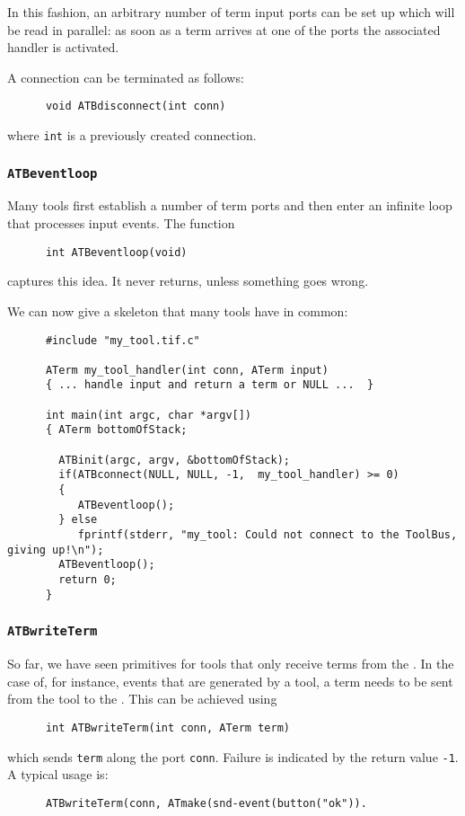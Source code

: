 \documentclass[a4,twoside,noweb]{article} %
\begin{document}
In this fashion, an arbitrary number of term input ports can be set up which
will be read in parallel: as soon as a term arrives at one of the ports
the associated handler is activated.

A connection can be terminated as follows:
\begin{verbatim}
      void ATBdisconnect(int conn)
\end{verbatim}
where {\tt int} is a previously created connection.

\subsubsection{\label{ATBeventloop}{\tt ATBeventloop}}
Many tools first establish a number of term ports
and then enter an infinite loop that processes input events.
The function
\begin{verbatim}
      int ATBeventloop(void)
\end{verbatim}
captures this idea. It never returns, unless something goes wrong.

We can now give a skeleton that many tools have in common:

\begin{verbatim}
      #include "my_tool.tif.c"

      ATerm my_tool_handler(int conn, ATerm input)
      { ... handle input and return a term or NULL ...  }

      int main(int argc, char *argv[]) 
      { ATerm bottomOfStack;

        ATBinit(argc, argv, &bottomOfStack);
        if(ATBconnect(NULL, NULL, -1,  my_tool_handler) >= 0)
        {
           ATBeventloop();
        } else 
           fprintf(stderr, "my_tool: Could not connect to the ToolBus, giving up!\n");
        ATBeventloop();
        return 0; 
      }
\end{verbatim}


\subsubsection{\label{ATBwriteTerm}{\tt ATBwriteTerm}}
So far, we have seen primitives for tools that only receive
terms from the \TB. In the case of, for instance,
events that are generated by a tool, a term needs to be sent from the tool
to the \TB. This can be achieved using
\begin{verbatim}
      int ATBwriteTerm(int conn, ATerm term)
\end{verbatim}
which sends {\tt term} along the port {\tt conn}. Failure is indicated by the
return value {\tt -1}. A typical usage is:
\begin{verbatim}
      ATBwriteTerm(conn, ATmake(snd-event(button("ok")).
\end{verbatim}
\end{document}
